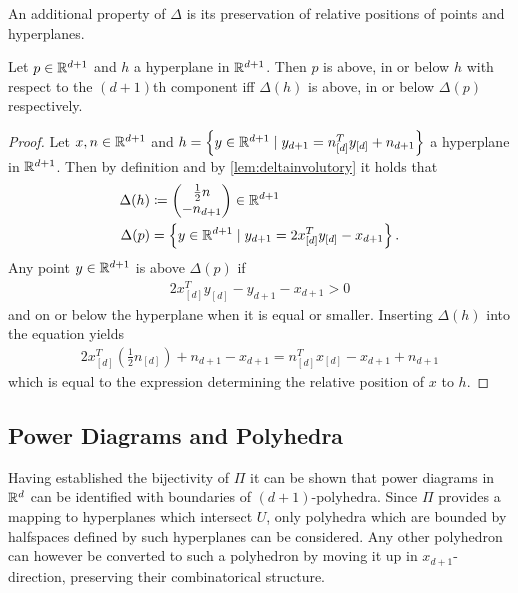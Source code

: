 An additional property of $\Delta$ is its preservation of relative positions of points and hyperplanes.
\begin{lemma}
    \label{lem:relativepositions}
    Let $p \in \mathbb{R}^{d+1}$ and $h$ a hyperplane in $\mathbb{R}^{d+1}$.
    Then $p$ is above, in or below $h$ with respect to the $(d+1)$th component iff $\Delta(h)$ is above, in or below $\Delta(p)$ respectively.
\end{lemma}
\begin{proof}
    Let $x,n \in \mathbb{R}^{d+1}$ and $h = \left\{ y \in \mathbb{R}^{d+1} \mid y_{d+1} = n_{[d]}^Ty_{[d]} + n_{d+1} \right\}$ a hyperplane in $\mathbb{R}^{d+1}$.
    Then by definition and by \cref{lem:deltainvolutory} it holds that
    \begin{align}
        \Delta(h) &\coloneqq \begin{pmatrix} \frac{1}{2} n \\ -n_{d+1} \end{pmatrix}  \in \mathbb{R}^{d+1}\\
        \Delta(p) &= \left\{ y \in \mathbb{R}^{d+1} \mid y_{d+1} = 2x_{[d]}^Ty_{[d]} - x_{d+1} \right\}.
    \end{align}
    Any point $y \in \mathbb{R}^{d+1}$ is above $\Delta(p)$ if
    \begin{align}
        2x_{[d]}^Ty_{[d]} - y_{d+1} - x_{d+1} > 0
    \end{align}
    and on or below the hyperplane when it is equal or smaller.
    Inserting $\Delta(h)$ into the equation yields
    \begin{align}
        2x_{[d]}^T \left( \frac{1}{2}n_{[d]} \right) + n_{d+1} - x_{d+1} = n_{[d]}^Tx_{[d]} - x_{d+1} + n_{d+1}
    \end{align}
    which is equal to the expression determining the relative position of $x$ to $h$.
\end{proof}

\subsection{Power Diagrams and Polyhedra}
\label{sub:power_diagrams_and_polyhedra}
Having established the bijectivity of $\Pi$ it can be shown that power diagrams in $\mathbb{R}^d$ can be identified with boundaries of $(d+1)$-polyhedra.
Since $\Pi$ provides a mapping to hyperplanes which intersect $U$, only polyhedra which are bounded by halfspaces defined by such hyperplanes can be considered.
Any other polyhedron can however be converted to such a polyhedron by moving it up in $x_{d+1}$-direction, preserving their combinatorical structure.

